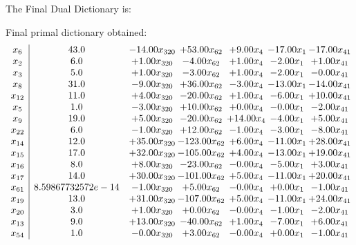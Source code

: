 \documentclass[8pt]{article}
\begin{document}
The Final Dual Dictionary is: 

 Final primal dictionary obtained: 
\[\begin{array}{c| c c@{\hskip 2pt} c@{\hskip 2pt} c@{\hskip 2pt} c@{\hskip 2pt} c@{\hskip 2pt} }
 x_{6}   &  43.0 & -14.00 x_{320} & + 53.00 x_{62} & +  9.00 x_{4} & -17.00 x_{1} & -17.00 x_{41}\\
 x_{2}   &  6.0 & +  1.00 x_{320} & -4.00 x_{62} & +  1.00 x_{4} & -2.00 x_{1} & +  1.00 x_{41}\\
 x_{3}   &  5.0 & +  1.00 x_{320} & -3.00 x_{62} & +  1.00 x_{4} & -2.00 x_{1} & -0.00 x_{41}\\
 x_{8}   &  31.0 & -9.00 x_{320} & + 36.00 x_{62} & -3.00 x_{4} & -13.00 x_{1} & -14.00 x_{41}\\
 x_{12}   &  11.0 & +  4.00 x_{320} & -20.00 x_{62} & +  1.00 x_{4} & -6.00 x_{1} & + 10.00 x_{41}\\
 x_{5}   &  1.0 & -3.00 x_{320} & + 10.00 x_{62} & +  0.00 x_{4} & -0.00 x_{1} & -2.00 x_{41}\\
 x_{9}   &  19.0 & +  5.00 x_{320} & -20.00 x_{62} & + 14.00 x_{4} & -4.00 x_{1} & +  5.00 x_{41}\\
 x_{22}   &  6.0 & -1.00 x_{320} & + 12.00 x_{62} & -1.00 x_{4} & -3.00 x_{1} & -8.00 x_{41}\\
 x_{14}   &  12.0 & + 35.00 x_{320} & -123.00 x_{62} & +  6.00 x_{4} & -11.00 x_{1} & + 28.00 x_{41}\\
 x_{15}   &  17.0 & + 32.00 x_{320} & -105.00 x_{62} & +  4.00 x_{4} & -13.00 x_{1} & + 19.00 x_{41}\\
 x_{16}   &  8.0 & +  8.00 x_{320} & -23.00 x_{62} & -0.00 x_{4} & -5.00 x_{1} & +  3.00 x_{41}\\
 x_{17}   &  14.0 & + 30.00 x_{320} & -101.00 x_{62} & +  5.00 x_{4} & -11.00 x_{1} & + 20.00 x_{41}\\
 x_{61}   &  8.59867732572e-14 & -1.00 x_{320} & +  5.00 x_{62} & -0.00 x_{4} & +  0.00 x_{1} & -1.00 x_{41}\\
 x_{19}   &  13.0 & + 31.00 x_{320} & -107.00 x_{62} & +  5.00 x_{4} & -11.00 x_{1} & + 24.00 x_{41}\\
 x_{20}   &  3.0 & +  1.00 x_{320} & +  0.00 x_{62} & -0.00 x_{4} & -1.00 x_{1} & -2.00 x_{41}\\
 x_{13}   &  9.0 & + 13.00 x_{320} & -40.00 x_{62} & +  1.00 x_{4} & -7.00 x_{1} & +  6.00 x_{41}\\
 x_{54}   &  1.0 & -0.00 x_{320} & +  3.00 x_{62} & -0.00 x_{4} & +  0.00 x_{1} & -1.00 x_{41}\\

\end{array}\]
\end{document}
